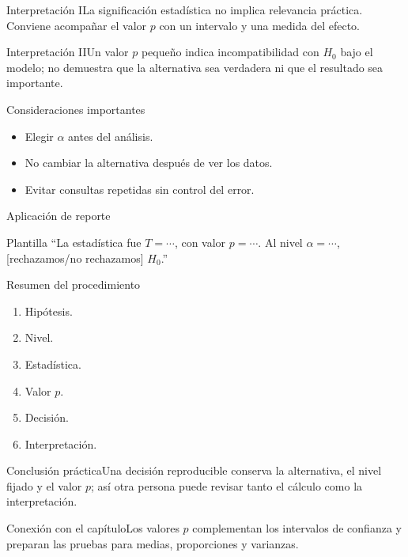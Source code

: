 \documentclass[10pt,aspectratio=169]{beamer}
\begin{document}
\begin{frame}{Interpretación I}\small La significación estadística no implica relevancia práctica. Conviene acompañar el valor $p$ con un intervalo y una medida del efecto.\end{frame}
\begin{frame}{Interpretación II}\small Un valor $p$ pequeño indica incompatibilidad con $H_0$ bajo el modelo; no demuestra que la alternativa sea verdadera ni que el resultado sea importante.\end{frame}
\begin{frame}{Consideraciones importantes}\small\begin{itemize}\item Elegir $\alpha$ antes del análisis.\item No cambiar la alternativa después de ver los datos.\item Evitar consultas repetidas sin control del error.\end{itemize}\end{frame}
\begin{frame}{Aplicación de reporte}\small\begin{block}{Plantilla} ``La estadística fue $T=\cdots$, con valor $p=\cdots$. Al nivel $\alpha=\cdots$, [rechazamos/no rechazamos] $H_0$.''\end{block}\end{frame}
\begin{frame}{Resumen del procedimiento}\small\begin{enumerate}\item Hipótesis.\item Nivel.\item Estadística.\item Valor $p$.\item Decisión.\item Interpretación.\end{enumerate}\end{frame}
\begin{frame}{Conclusión práctica}\small Una decisión reproducible conserva la alternativa, el nivel fijado y el valor $p$; así otra persona puede revisar tanto el cálculo como la interpretación.\end{frame}
\begin{frame}{Conexión con el capítulo}\small Los valores $p$ complementan los intervalos de confianza y preparan las pruebas para medias, proporciones y varianzas.\end{frame}
\end{document}
